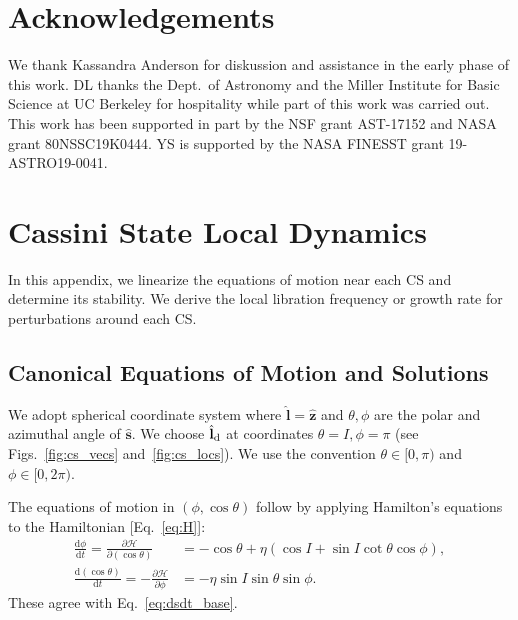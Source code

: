 \documentclass[twocolumn,twocolappendix]{aastex63}
\newcommand*{\rd}[2]{\frac{\mathrm{d}#1}{\mathrm{d}#2}}
\newcommand*{\pd}[2]{\frac{\partial#1}{\partial#2}}
\newcommand*{\bsmb}[1]{\boldsymbol{\mathbf{#1}}}
\newcommand*{\uv}[1]{\hat{\bsmb{#1}}}
\newcommand*{\p}[1]{\left(#1\right)}
\begin{document}
\section*{Acknowledgements}

We thank Kassandra Anderson for diskussion and assistance in the early phase of
this work. DL thanks the Dept.\ of Astronomy and the Miller Institute for Basic
Science at UC Berkeley for hospitality while part of this work was carried out.
This work has been supported in part by the NSF grant AST-17152 and NASA grant
80NSSC19K0444. YS is supported by the NASA FINESST grant
19-ASTRO19-0041.%




\appendix

\section{Cassini State Local Dynamics}\label{s:local_dynamics}

In this appendix, we linearize the equations of motion near each CS and
determine its stability. We derive the local libration frequency or growth
rate for perturbations around each CS\@.

\subsection{Canonical Equations of Motion and Solutions}\label{ss:canonical}

We adopt spherical coordinate system where $\uv{l} =
\uv{z}$ and $\theta, \phi$ are the polar and azimuthal angle of $\uv{s}$. We
choose $\uv{l}_{\rm d}$ at coordinates $\theta = I, \phi = \pi$ (see
Figs.~\ref{fig:cs_vecs} and~\ref{fig:cs_locs}). We use the convention
$\theta \in [0, \pi)$ %
and $\phi \in [0, 2\pi)$.%

The equations of motion in $\p{\phi, \cos \theta}$ follow by
applying Hamilton's equations to the Hamiltonian [Eq.~\eqref{eq:H}]:
\begin{subequations}\label{se:H_eom}
    \begin{align}
        \rd{\phi}{t} = \pd{\mathcal{H}}{(\cos\theta)}
            &= -\cos\theta + \eta\p{\cos I + \sin I \cot \theta \cos \phi},
                \label{seq:H_eom_phi_t}\\
        \rd{(\cos \theta)}{t} = -\pd{\mathcal{H}}{\phi}
            &= -\eta \sin I \sin \theta \sin \phi.
                \label{seq:H_eom_mu_t}
    \end{align}
\end{subequations}
These agree with Eq.~\eqref{eq:dsdt_base}.
\end{document}
